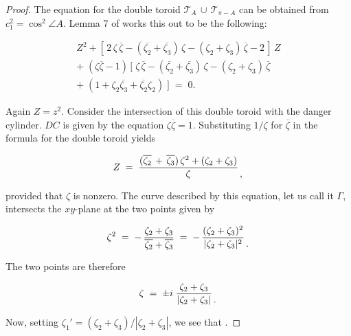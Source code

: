 \documentclass[a4paper, twoside]{article}
\begin{document}
\begin{proof}

The equation for the double toroid $\mathcal{T}_A \, \cup \, \mathcal{T}_{\pi-A}$ can be obtained from $c_1^2 = \cos^2 \angle A$. Lemma 7 of \cite{RW} works this out to be the following:

\vspace{-2mm} 

$$\begin{array}{l} 
Z^2 + [ \, 2 \, \zeta \, \overline{\zeta} - (\overline{\zeta_2} + \overline{\zeta_3}) \, \zeta  - (\zeta_2 + \zeta_3) \, \overline{\zeta} - 2 \, ] \, Z \\
+ \; ( \zeta \overline{\zeta} - 1) \, [ \; \zeta \, \overline{\zeta} - (\overline{\zeta_2} + \overline{\zeta_3}) \, \zeta  - (\zeta_2 + \zeta_3) \, \overline{\zeta} \\
+ \; (1 + \zeta_2 \overline{\zeta_3} + \overline{\zeta_2} \zeta_2 ) \; ] \; = \; 0. 
\end{array}$$

\vspace{2mm} 

Again $Z=z^2$. Consider the intersection of this double toroid with the danger cylinder. $DC$ is given by the equation $\zeta \overline{\zeta} = 1$. Substituting $1/\zeta$ for $\overline{\zeta}$ in the formula for the double toroid yields 

$$Z \; = \; \frac{(\overline{\zeta_2} \, + \, \overline{\zeta_3}) \, \zeta^2 + (\zeta_2 + \zeta_3)} {\zeta} {\ \atop ,} $$ 

\vspace{2mm} 

\noindent provided that $\zeta$ is nonzero. The curve described by this equation, let us call it $\Gamma$, intersects the $xy$-plane at the two points given by 

$$ \zeta^2 \; = \; - \, \frac{\zeta_2 + \zeta_3}{\overline{\zeta_2} + \overline{\zeta_3}} \; = \; - \, \frac{(\zeta_2 + \zeta_3)^2}{|\zeta_2 + \zeta_3|^2} {\ \atop .} $$

\vspace{2mm}

\noindent The two points are therefore 

$$ \zeta \; = \; \pm i \; \frac{\zeta_2 + \zeta_3}{|\zeta_2 + \zeta_3|} {\ \atop .} $$

\vspace{2mm}

Now, setting $\zeta_1' = (\zeta_2 + \zeta_3) / |\zeta_2 + \zeta_3|$, we see that . 


\end{proof}
\end{document}
